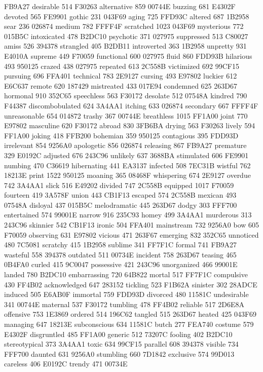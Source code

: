 FB9A27 desirable 514 F30263 alternative 859 00744E buzzing 681 E4302F
devoted 565 FE9901 gothic 231 043F69 aging 725 FFD93C altered 687
1B2958 sear 236 026874 medium 782 FFFF4F scratched 1023 043F69
mysterious 772 015B5C intoxicated 478 B2DC10 psychotic 371 027975
suppressed 513 C80027 amiss 526 394378 strangled 405 B2DB11 introverted
363 1B2958 unpretty 931 E4010A supreme 449 F70059 functional 600 027975
fluid 860 FDD93B hilarious 493 950125 crazed 438 027975 repeated 613
2C558B victimized 692 99CF15 pursuing 696 FFA401 technical 783 2E9127
cursing 493 E97802 luckier 612 E6C637 remote 620 187429 mistreated 433
017E94 condemned 625 263D67 hormonal 910 352C65 speechless 563 F30172
desolate 512 07548A kindred 790 F44387 discombobulated 624 3A4AA1
itching 633 026874 secondary 667 FFFF4F unreasonable 654 014872 trashy
367 00744E breathless 1015 FF1A00 joint 770 E97802 masculine 620 F30172
abroad 830 3FB6BA drying 563 F30263 lively 594 FF1A00 joking 418 FFB200
bohemian 359 950125 contagious 395 FDD93D irrelevant 854 9256A0
apologetic 856 026874 releasing 867 FB9A27 premature 329 E0192C
adjusted 676 243C96 unlikely 637 3688BA stimulated 606 FE9901 numbing
470 C36619 hibernating 441 EA3137 infected 508 7EC31B wistful 762
18213E print 1522 950125 moaning 365 08468F whispering 674 2E9127
overdue 742 3A4AA1 slick 516 E49202 divided 747 2C558B equipped 1017
F70059 fourteen 419 3A578F union 443 CB1F13 escaped 574 2C558B mexican
493 07548A disloyal 437 015B5C melodramatic 445 263D67 dodgy 303 FFF700
entertained 574 99001E narrow 916 235C93 homey 499 3A4AA1 murderous 313
243C96 skinnier 542 CB1F13 ironic 504 FFA401 mainstream 732 9256A0 bow
605 F70059 observing 631 E97802 vicious 471 263F67 emerging 832 352C65
unnoticed 480 7C5081 scratchy 415 1B2958 sublime 341 FF7F1C formal 741
FB9A27 wasteful 558 394378 outdated 511 00734E incident 758 263D67
teasing 465 0B4FA0 curled 415 9C0047 possessive 421 243C96 unorganized
466 99001E landed 780 B2DC10 embarrassing 720 64B822 mortal 517 FF7F1C
compulsive 430 FF4B02 acknowledged 647 283152 tickling 523 F1B62A
sinister 302 28ADCE induced 505 E6AB0F immortal 759 FDD93D divorced 480
11581C undesirable 341 00744E maternal 537 F30172 tumbling 478 FF4B02
reliable 517 2D6E8A offensive 753 1E3869 ordered 514 196C62 tangled 515
263D67 heated 425 043F69 managing 647 18213E subconscious 634 11581C
butch 277 FEA740 costume 579 E4302F disgruntled 485 FF1A00 generic 512
73207C fooling 402 B2DC10 stereotypical 373 3A4AA1 toxic 634 99CF15
parallel 608 394378 visible 734 FFF700 daunted 631 9256A0 stumbling 660
7D1842 exclusive 574 99D013 careless 406 E0192C trendy 471 00734E
